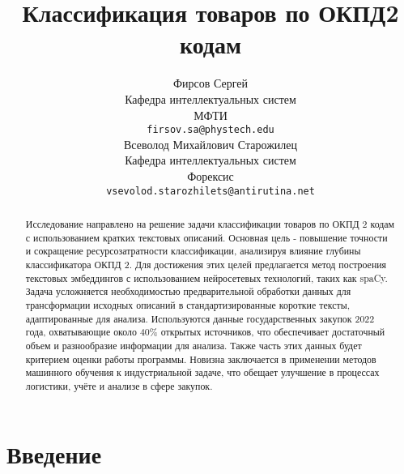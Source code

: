 \documentclass{article}
\title{Классификация товаров по ОКПД2 кодам}
\author{ Фирсов Сергей \\
        Кафедра интеллектуальных систем\\
	МФТИ\\
	\texttt{firsov.sa@phystech.edu} \\
	\And
	Всеволод Михайлович Старожилец \\
	Кафедра интеллектуальных систем\\
	Форексис\\
	\texttt{vsevolod.starozhilets@antirutina.net} \\
}
\date{}
\begin{document}
\maketitle

\begin{abstract}
    Исследование направлено на решение задачи классификации товаров по ОКПД 2 кодам с использованием кратких текстовых описаний. Основная цель - повышение точности и сокращение ресурсозатратности классификации, анализируя влияние глубины классификатора ОКПД 2. Для достижения этих целей предлагается метод построения текстовых эмбеддингов с использованием нейросетевых технологий, таких как spaCy. Задача усложняется необходимостью предварительной обработки данных для трансформации исходных описаний в стандартизированные короткие тексты, адаптированные для анализа. Используются данные государственных закупок 2022 года, охватывающие около 40\% открытых источников, что обеспечивает достаточный объем и разнообразие информации для анализа. Также часть этих данных будет критерием оценки работы программы. Новизна заключается в применении методов машинного обучения к индустриальной задаче, что обещает улучшение в процессах логистики, учёте и анализе в сфере закупок.


 
\end{abstract}



\section{Введение}





\end{document}
